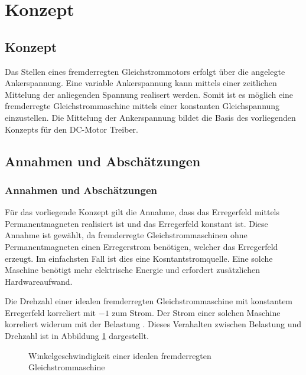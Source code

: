 \ifSTANDALONE
\section{Konzept}
\fi
\ifEMBED
\subsection{Konzept}
\fi

Das Stellen eines fremderregten Gleichstrommotors erfolgt über die
angelegte Ankerspannung. Eine variable Ankerspannung kann mittels einer 
zeitlichen Mittelung der anliegenden Spannung realisert werden. Somit
ist es möglich eine fremderregte Gleichstrommaschine mittels einer
konstanten Gleichspannung einzustellen. Die Mittelung der Ankerspannung
bildet die Basis des vorliegenden Konzepts für den DC-Motor Treiber.

\ifSTANDALONE
\subsection{Annahmen und Abschätzungen}\label{sec:annahmen}
\fi
\ifEMBED
\subsubsection{Annahmen und Abschätzungen}\label{sec:annahmen}
\fi
Für das vorliegende Konzept gilt die Annahme, dass das Erregerfeld mittels
Permanentmagneten realisiert ist und das Erregerfeld konstant ist. Diese
Annahme ist gewählt, da fremderregte Gleichstrommaschinen ohne
Permanentmagneten einen Erregerstrom benötigen, welcher das Erregerfeld
erzeugt. Im einfachsten Fall ist dies eine Kosntantstromquelle. Eine solche
Maschine benötigt mehr elektrische Energie und erfordert zusätzlichen
Hardwareaufwand.

Die Drehzahl einer idealen fremderregten Gleichstrommaschine mit konstantem
Erregerfeld korreliert mit $-1$ zum Strom. Der Strom einer solchen Maschine
korreliert widerum mit der Belastung \cite[p.163]{smps}. Dieses Verahalten
zwischen Belastung und Drehzahl ist in Abbildung \ref{fig:ideal-dc-curve}
dargestellt.

\begin{figure}[h!]
    \centering
    \caption{Winkelgeschwindigkeit einer idealen fremderregten 
        Gleichstrommaschine}
    \label{fig:ideal-dc-curve}
\end{figure}

